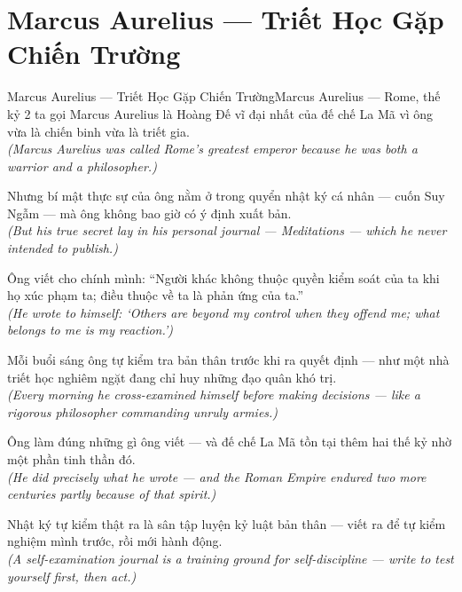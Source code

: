 \section{Marcus Aurelius --- Triết Học Gặp Chiến Trường}
\begin{truyen}{Marcus Aurelius --- Triết Học Gặp Chiến Trường}{Marcus Aurelius --- Rome, thế kỷ 2}
 ta gọi Marcus Aurelius là Hoàng Đế vĩ đại nhất của đế chế La Mã vì ông vừa là chiến binh vừa là triết gia.\\[4pt]
\textit{(Marcus Aurelius was called Rome's greatest emperor because he was both a warrior and a philosopher.)}

Nhưng bí mật thực sự của ông nằm ở trong quyển nhật ký cá nhân --- cuốn Suy Ngẫm --- mà ông không bao giờ có ý định xuất bản.\\[4pt]
\textit{(But his true secret lay in his personal journal --- Meditations --- which he never intended to publish.)}

Ông viết cho chính mình: ``Người khác không thuộc quyền kiểm soát của ta khi họ xúc phạm ta; điều thuộc về ta là phản ứng của ta.''\\[4pt]
\textit{(He wrote to himself: `Others are beyond my control when they offend me; what belongs to me is my reaction.')}

Mỗi buổi sáng ông tự kiểm tra bản thân trước khi ra quyết định --- như một nhà triết học nghiêm ngặt đang chỉ huy những đạo quân khó trị.\\[4pt]
\textit{(Every morning he cross-examined himself before making decisions --- like a rigorous philosopher commanding unruly armies.)}

Ông làm đúng những gì ông viết --- và đế chế La Mã tồn tại thêm hai thế kỷ nhờ một phần tinh thần đó.\\[4pt]
\textit{(He did precisely what he wrote --- and the Roman Empire endured two more centuries partly because of that spirit.)}

\end{truyen}
\begin{baihoc}
  Nhật ký tự kiểm thật ra là sân tập luyện kỷ luật bản thân --- viết ra để tự kiểm nghiệm mình trước, rồi mới hành động.\\[4pt]
  \textit{(A self-examination journal is a training ground for self-discipline --- write to test yourself first, then act.)}
\end{baihoc}

